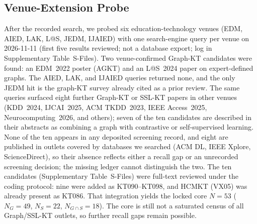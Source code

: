 \documentclass[lettersize,journal]{IEEEtran}
\begin{document}
\subsection{Venue-Extension Probe}
\label{sec:venue_ext}
After the recorded search, we probed six education-technology venues (EDM, AIED, LAK, L@S, JEDM, IJAIED) with one search-engine query per venue on 2026-11-11 (first five results reviewed; not a database export; log in Supplementary Table~S-Files). Two venue-confirmed Graph-KT candidates were found: an EDM~2022 poster (AGKT) and an L@S~2024 paper on expert-defined graphs. The AIED, LAK, and IJAIED queries returned none, and the only JEDM hit is the graph-KT survey already cited as a prior review. The same queries surfaced eight further Graph-KT or SSL-KT papers in other venues (KDD~2024, IJCAI~2025, ACM TKDD~2023, IEEE Access~2025, Neurocomputing~2026, and others); seven of the ten candidates are described in their abstracts as combining a graph with contrastive or self-supervised learning. None of the ten appears in any deposited screening record, and eight are published in outlets covered by databases we searched (ACM DL, IEEE Xplore, ScienceDirect), so their absence reflects either a recall gap or an unrecorded screening decision; the missing ledger cannot distinguish the two. The ten candidates (Supplementary Table~S-Files) were full-text reviewed under the coding protocol: nine were added as KT090--KT098, and HCMKT (VX05) was already present as KT086. That integration yields the locked core $N=53$ ($N_G=49$, $N_S=22$, $N_{G\cap S}=18$). The core is still not a saturated census of all Graph/SSL-KT outlets, so further recall gaps remain possible.
\end{document}

